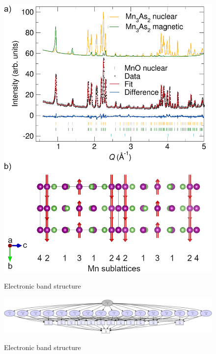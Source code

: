 \documentclass[11pt,edeposit,draftthesis]{uiucthesis2020}
\begin{document}
\begin{mainmatter}
\begin{figure}
\centering\includegraphics[width=\columnwidth]{figures/ch6/250K_mag_structure.png} \\
\caption{\label{fig:250K}
Electronic band structure
}
\end{figure}


\begin{figure}
\centering\includegraphics[width=\columnwidth]{figures/ch6/graph_of_subgraphs_3K.png} \\
\caption{\label{fig:subgraphs}
Electronic band structure
}
\end{figure}


\end{mainmatter}
\end{document}
